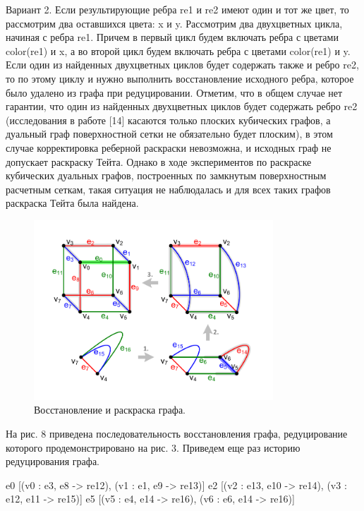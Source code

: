 Вариант 2. Если результирующие ребра re1 и re2 имеют один и тот же цвет, то рассмотрим два оставшихся цвета: x и y.
Рассмотрим два двухцветных цикла, начиная с ребра re1.
Причем в первый цикл будем включать ребра с цветами color(re1) и x, а во второй цикл будем включать ребра с цветами color(re1) и y.
Если один из найденных двухцветных циклов будет содержать также и ребро re2, то по этому циклу и нужно выполнить восстановление исходного ребра, которое было удалено из графа при редуцировании.
Отметим, что в общем случае нет гарантии, что один из найденных двухцветных циклов будет содержать ребро re2 (исследования в работе [14] касаются только плоских кубических графов, а дуальный граф поверхностной сетки не обязательно будет плоским), в этом случае корректировка реберной раскраски невозможна, и исходных граф не допускает раскраску Тейта.
Однако в ходе экспериментов по раскраске кубических дуальных графов, построенных по замкнутым поверхностным расчетным сеткам, такая ситуация не наблюдалась и для всех таких графов раскраска Тейта была найдена.

\begin{figure}[ht]
	\centering
		\includegraphics[width=0.8\textwidth]{./pics/text_3_edge_coloring/8-restore-and-repaint.pdf}
	\caption{Восстановление и раскраска графа.}
	\label{fig:text_3_edge_coloring_8}
\end{figure}

На рис. 8 приведена последовательность восстановления графа, редуцирование которого продемонстрировано на рис. 3.
Приведем еще раз историю редуцирования графа.

e0 [(v0 : e3, e8 -> re12), (v1 : e1, e9 -> re13)]
e2 [(v2 : e13, e10 -> re14), (v3 : e12, e11 -> re15)]
e5 [(v5 : e4, e14 -> re16), (v6 : e6, e14 -> re16)]

